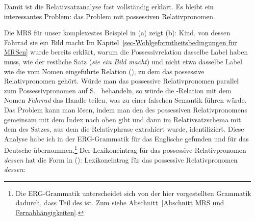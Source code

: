 Damit ist die Relativsatzanalyse fast vollständig erklärt. Es bleibt ein interessantes Problem: das
Problem mit possessiven Relativpronomen. 

Die MRS für unser komplexestes Beispiel in (a) zeigt (b):
\eal
\ex\label{ex Kind, von dessen Fahrrad sie ein Bild macht}
Kind, von dessen Fahrrad sie ein Bild macht
\ex {}
\zl
Im Kapitel~\ref{sec-Wohlgeformtheitsbedingungen für MRSen} wurde bereits erklärt, warum die
Possessivrelation  dasselbe Label haben muss, wie der restliche Satz (\emph{sie
  ein Bild macht}) und nicht etwa dasselbe Label wie die vom Nomen eingeführte Relation
(), zu dem das possessive Relativpronomen gehört. Würde man das possessive
Relativpronomen parallel zum Possessivpronomen auf S.~\pageref{le-Possessivpronomen} behandeln, so
würde die -Relation mit dem Nomen \emph{Fahrrad} das 
Handle teilen, was zu einer falschen Semantik führen würde. Das Problem kann man lösen, indem man
den \ltopw des possessiven Relativpronomens gemeinsam mit dem Index nach oben gibt und dann im
Relativsatzschema mit dem \ltopw des Satzes, aus dem die Relativphrase extrahiert wurde,
identifiziert. Diese Analyse habe ich in der ERG-Grammatik für das Englische \citep{CF2000a-u} gefunden und für das
Deutsche übernommen.\footnote{%
Die ERG-Grammatik unterscheidet sich von der hier vorgestellten Grammatik dadurch, dass \rels Teil
des \contwes ist. Zum \contw siehe Abschnitt~\ref{Abschnitt MRS und Fernabhängigkeiten}.
}
Der Lexikoneintrag für das possessive Relativpronomen \emph{dessen} hat die Form in ():
\ea
\label{le-dessen}%
Lexikoneintrag für das possessive Relativpronomen \emph{dessen}:\\
